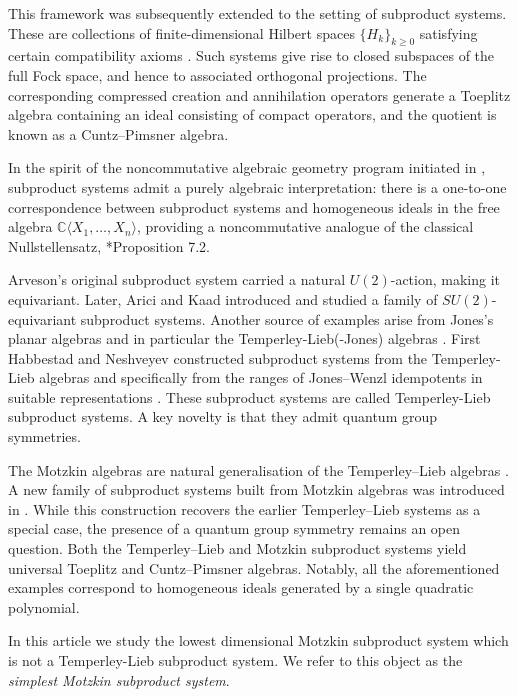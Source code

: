 \documentclass[12pt, a4paper]{amsart}
\numberwithin{equation}{section}
\begin{document}
This framework was subsequently extended to the setting of subproduct systems. These are collections of finite-dimensional Hilbert spaces  
$\{H_k\}_{k\geq 0}$
satisfying certain compatibility axioms \cites{Bhat, Shalit}. Such systems give rise to closed subspaces of the full Fock space, and hence to associated orthogonal projections. The corresponding compressed creation and annihilation operators generate a Toeplitz algebra containing 
an ideal consisting of compact operators, and the quotient is known as a Cuntz–Pimsner algebra.

In the spirit of the noncommutative algebraic geometry program initiated in \cites{Popescu, Popescu2}, subproduct systems admit a purely algebraic interpretation: there is a one-to-one correspondence between subproduct systems and homogeneous ideals in the free algebra \(\mathbb{C}\langle X_1, \dots, X_n\rangle\), providing a noncommutative analogue of the classical Nullstellensatz, \cite{Shalit}*{Proposition 7.2}.

Arveson's original subproduct system carried a natural \(U(2)\)-action, making it equivariant. Later, Arici and Kaad \cite{AK} introduced and studied a family of \(SU(2)\)-equivariant subproduct systems. 
Another source of examples arise from Jones's planar algebras and in particular the Temperley-Lieb(-Jones) algebras \cite{Jones83,jo2}. 
First Habbestad and Neshveyev constructed subproduct systems from the Temperley-Lieb algebras and specifically from the ranges of Jones–Wenzl idempotents in suitable representations \cites{Nesh, Nesh2, Nesh3}. These subproduct systems are called 
Temperley-Lieb subproduct systems.
A key novelty  is that they admit quantum group symmetries.

The Motzkin algebras are natural generalisation of the Temperley–Lieb algebras \cite{Halverson}.
A new family of subproduct systems built from Motzkin algebras was introduced in \cite{ADR01}. 
While this construction recovers the earlier Temperley–Lieb systems as a special case, the presence of a quantum group symmetry remains an open question. 
Both the Temperley–Lieb and Motzkin subproduct systems yield universal Toeplitz and Cuntz–Pimsner algebras. 
Notably, all the aforementioned examples correspond to homogeneous ideals generated by a single quadratic polynomial.

In this article we study the lowest dimensional Motzkin subproduct system which is not a Temperley-Lieb subproduct system. We refer to this object as the \emph{simplest Motzkin subproduct system}. 
\end{document}
